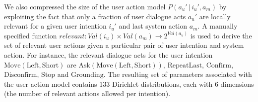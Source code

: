 
We also compressed the size of the user action model $P(a_u'\, | \, i_u', a_m)$ by exploiting the fact that only a fraction of user dialogue acts $a_u'$ are locally relevant for a given user intention $i_u'$ and last system action $a_m$.  A manually specified function $relevant: \mathit{Val}(i_u) \times \mathit{Val}(a_m) \rightarrow 2^{\mathit{Val}(a_u)}$ is used to derive the set of relevant user actions given a particular pair of user intention and system action. For instance, the relevant dialogue acts for the user intention $\mathrm{Move(Left,Short)}$ are $\mathrm{Ask(Move(Left,Short))}$, $\mathrm{RepeatLast}$, $\mathrm{Confirm}$, $\mathrm{Disconfirm}$, $\mathrm{Stop}$ and $\mathrm{Grounding}$. The resulting set of parameters associated with the user action model contains 133 Dirichlet distributions, each with 6 dimensions (the number of relevant actions allowed per intention). 

